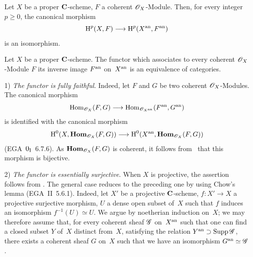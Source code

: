 \begin{corollary}
\label{XII.4.3}
Let $X$ be a proper $\mathbf{C}$-scheme, $F$ a coherent $\cal{O}_X$-Module.
Then, for every integer $p\geq 0$, the canonical
morphism
$$
\H^p(X,F)\to \H^p(X^{\an},F^{\an})
$$
is an isomorphism.
\end{corollary}

\begin{theorem}
\label{XII.4.4}
Let $X$ be a proper $\mathbf{C}$-scheme. The functor which associates to every
coherent $\cal{O}_X$-Module $F$ its inverse image
$F^{\mathrm{an}}$ on~$X^{\mathrm{an}}$ is an equivalence of categories.
\end{theorem}

1) \emph{The functor is fully faithful}. Indeed, let $F$
and $G$ be two coherent $\cal{O}_X$-Modules. The canonical morphism
$$
\Hom_{\cal{O}_X}(F,G)\to \Hom_{\cal{O}_{X^{\an}}}(F^{\an},G^{\an})
$$
is identified with the canonical morphism
$$
\H^0(X,\SheafHom_{\cal{O}_X}(F,G))\to
\H^0(X^{\an},\SheafHom_{\cal{O}_X}(F,G))
$$
(EGA~$0_{\textup{I}}$~6.7.6). As $\SheafHom_{\cal{O}_X}(F,G)$ is
coherent, it follows from~ that this morphism is
bijective.

2) \emph{The functor is essentially surjective}. When $X$ is
projective, the assertion follows from \cite[~th]{XII.10}. The
general case reduces to the preceding one by using
Chow's lemma (EGA~II~5.6.1). Indeed, let $X'$ be a projective
$\mathbf{C}$-scheme, $f\colon X'\to X$ a projective surjective morphism, $U$ a
dense open subset of~$X$ such that $f$ induces an isomorphism
$f^{-1}(U)\simeq U$. We argue by noetherian induction
on~$X$; we may therefore assume that, for every coherent sheaf
$\cal{G}$ on~$X^{\mathrm{an}}$ such that one can find a closed
subset $Y$ of~$X$ distinct from~$X$, satisfying the relation
$Y^{\an}\supset \Supp \cal{G}$, there exists a coherent sheaf $G$
on~$X$ such that we have an isomorphism $G^{\an}\simeq \cal{G}$.

